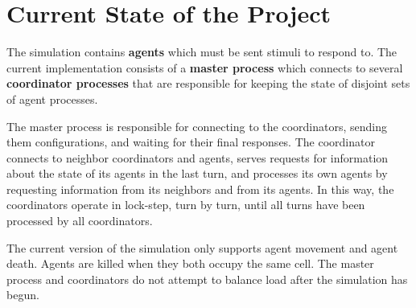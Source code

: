 \section{Current State of the Project}

The simulation contains \textbf{agents} which must be sent stimuli to respond to. The current
implementation consists of a \textbf{master process} which connects to several \textbf{coordinator
processes} that are responsible for keeping the state of disjoint sets of agent processes.

The master process is responsible for connecting to the coordinators, sending them configurations,
and waiting for their final responses. The coordinator connects to neighbor coordinators and agents,
serves requests for information about the state of its agents in the last turn, and processes its
own agents by requesting information from its neighbors and from its agents. In this way, the
coordinators operate in lock-step, turn by turn, until all turns have been processed by all
coordinators.

The current version of the simulation only supports agent movement and agent death. Agents are
killed when they both occupy the same cell. The master process and coordinators do not attempt to
balance load after the simulation has begun.
